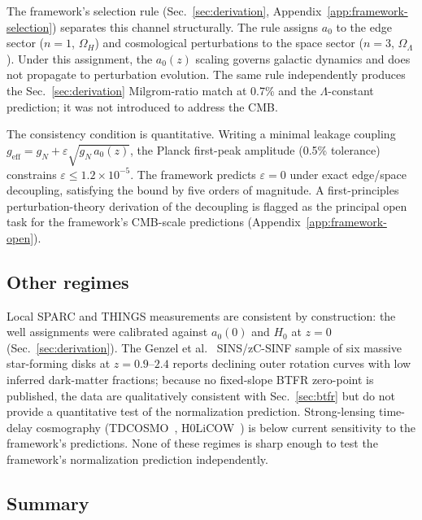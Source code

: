 \documentclass[
    aps,
    prd,
    reprint,
    superscriptaddress,
    nofootinbib,
    floatfix
]{revtex4-2}
\begin{document}
The framework's selection rule (Sec.~\ref{sec:derivation},
Appendix~\ref{app:framework-selection}) separates this channel
structurally. The rule assigns $a_0$ to the edge sector ($n = 1$,
$\Omega_H$) and cosmological perturbations to the space sector
($n = 3$, $\Omega_\Lambda$). Under this assignment, the $a_0(z)$
scaling governs galactic dynamics and does not propagate to
perturbation evolution. The same rule independently produces the
Sec.~\ref{sec:derivation} Milgrom-ratio match at 0.7\% and the
$\Lambda$-constant prediction; it was not introduced to address the
CMB.

The consistency condition is quantitative. Writing a minimal leakage
coupling $g_\text{eff} = g_N + \varepsilon\sqrt{g_N\,a_0(z)}$, the
Planck first-peak amplitude (0.5\% tolerance) constrains
$\varepsilon \leq 1.2 \times 10^{-5}$. The framework predicts
$\varepsilon = 0$ under exact edge/space decoupling, satisfying the
bound by five orders of magnitude. A first-principles
perturbation-theory derivation of the decoupling is flagged as the
principal open task for the framework's CMB-scale predictions
(Appendix~\ref{app:framework-open}).

\subsection{Other regimes}
\label{sec:other}

Local SPARC and THINGS measurements are consistent by construction:
the well assignments were calibrated against $a_0(0)$ and $H_0$ at
$z = 0$ (Sec.~\ref{sec:derivation}). The Genzel et
al.~\cite{Genzel2017} SINS/zC-SINF sample of six massive
star-forming disks at $z = 0.9\text{--}2.4$ reports declining outer
rotation curves with low inferred dark-matter fractions; because no
fixed-slope BTFR zero-point is published, the data are qualitatively
consistent with Sec.~\ref{sec:btfr} but do not provide a
quantitative test of the normalization prediction. Strong-lensing
time-delay cosmography (TDCOSMO~\cite{Millon2020},
H0LiCOW~\cite{Wong2020}) is below current sensitivity to the
framework's predictions. None of these regimes is sharp enough to
test the framework's normalization prediction independently.

\subsection{Summary}
\label{sec:constraints-summary}
\end{document}
